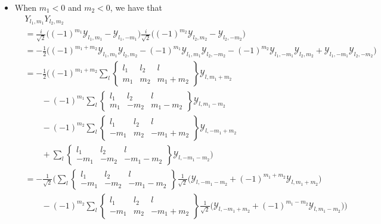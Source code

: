 \documentclass[10pt]{article}
\begin{document}
\begin{itemize}
		\item When $m_1 < 0$ and $m_2 < 0$, we have that
		\begin{align*}
			& Y_{l_1, m_1} Y_{l_2, m_2}\\
			&= \frac{i}{\sqrt{2}} \bigg( (-1)^{m_1} \mathcal{Y}_{l_1, m_1} - \mathcal{Y}_{l_1, -m_1} \bigg) \frac{i}{\sqrt{2}} \bigg( (-1)^{m_2} \mathcal{Y}_{l_2, m_2} - \mathcal{Y}_{l_2, -m_2} \bigg) \\
			&= -\frac{1}{2} \bigg( (-1)^{m_1+m_2} \mathcal{Y}_{l_1, m_1} \mathcal{Y}_{l_2, m_2} - (-1)^{m_1} \mathcal{Y}_{l_1, m_1}\mathcal{Y}_{l_2, -m_2} - (-1)^{m_2} \mathcal{Y}_{l_1, -m_1} \mathcal{Y}_{l_2, m_2} + \mathcal{Y}_{l_1, -m_1} \mathcal{Y}_{l_2, -m_2} \bigg) \\
			&= -\frac{1}{2} \bigg( 
			(-1)^{m_1+m_2}  \sum_{l} \begin{Bmatrix} l_1 & l_2 & l \\ m_1 & m_2 & m_1 + m_2 \end{Bmatrix} \mathcal{Y}_{l, m_1+m_2} \\
			& \qquad - (-1)^{m_1} \sum_{l} \begin{Bmatrix} l_1 & l_2 & l \\ m_1 & -m_2 & m_1 - m_2 \end{Bmatrix} \mathcal{Y}_{l, m_1-m_2} \\
			& \qquad - (-1)^{m_2} \sum_{l} \begin{Bmatrix} l_1 & l_2 & l \\ -m_1 & m_2 & -m_1 + m_2 \end{Bmatrix} \mathcal{Y}_{l, -m_1+m_2} \\
			& \qquad + \sum_{l} \begin{Bmatrix} l_1 & l_2 & l \\ -m_1 & -m_2 & -m_1 - m_2 \end{Bmatrix} \mathcal{Y}_{l, -m_1-m_2} \bigg) \\
			&= -\frac{1}{\sqrt{2}} \bigg( 
			\sum_{l} \begin{Bmatrix} l_1 & l_2 & l \\ -m_1 & -m_2 & -m_1 - m_2 \end{Bmatrix} \frac{1}{\sqrt{2}} \bigg( \mathcal{Y}_{l, -m_1-m_2} + (-1)^{m_1+m_2} \mathcal{Y}_{l, m_1+m_2} \bigg)  \\
			& \qquad - (-1)^{m_2} \sum_{l} \begin{Bmatrix} l_1 & l_2 & l \\ -m_1 & m_2 & -m_1 + m_2 \end{Bmatrix}
			\frac{1}{\sqrt{2}} \bigg( \mathcal{Y}_{l, -m_1+m_2} + (-1)^{m_1 - m_2} \mathcal{Y}_{l, m_1-m_2} \bigg) \bigg) \\

\end{align*}
\end{itemize}
\end{document}
